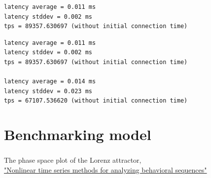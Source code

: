 \documentclass[usenames,dvipsnames, 18pt, compress, aspectratio=169]{beamer}
\begin{document}
\begin{frame}[fragile]{}
    \frametitle{}
    \begin{center}

		\begin{overprint}[12.5cm]
        \begin{verbatim}
latency average = 0.011 ms
latency stddev = 0.002 ms
tps = 89357.630697 (without initial connection time)
        \end{verbatim}

        \begin{verbatim}
latency average = 0.011 ms
latency stddev = 0.002 ms
tps = 89357.630697 (without initial connection time)

latency average = 0.014 ms
latency stddev = 0.023 ms
tps = 67107.536620 (without initial connection time)
        \end{verbatim}
		\end{overprint}

    \end{center}
\end{frame}

\section{Benchmarking model}

\begin{frame}
    \frametitle{}
    \begin{center}
        {
            The phase space plot of the Lorenz attractor,
            \\ {\scriptsize
                \href{https://www.researchgate.net/publication/339796576_Nonlinear_time_series_methods_for_analyzing_behavioral_sequences}
                     {{\color{gray!60} "Nonlinear time series methods for analyzing behavioral sequences"}}}
        }

    \end{center}
\end{frame}
\end{document}
